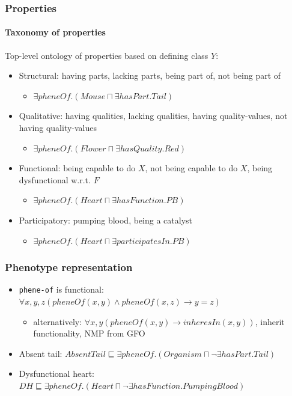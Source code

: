 \documentclass{beamer}
\begin{document}
\begin{frame}
\frametitle{Properties}
\framesubtitle{Taxonomy of properties}
Top-level ontology of properties based on defining class $Y$:
\begin{itemize}
\item Structural: having parts, lacking parts, being part of, not
  being part of
  \begin{itemize}
  \item $\exists pheneOf.(Mouse \sqcap \exists hasPart.Tail)$
  \end{itemize}
\item Qualitative: having qualities, lacking qualities, having
  quality-values, not having quality-values
  \begin{itemize}
  \item $\exists pheneOf.(Flower \sqcap \exists hasQuality.Red)$
  \end{itemize}
\item Functional: being capable to do $X$, not being capable to do
  $X$, being dysfunctional w.r.t. $F$
  \begin{itemize}
  \item $\exists pheneOf.(Heart \sqcap \exists hasFunction.PB)$
  \end{itemize}
\item Participatory: pumping blood, being a catalyst
  \begin{itemize}
  \item $\exists pheneOf.(Heart \sqcap \exists participatesIn.PB)$
  \end{itemize}
\end{itemize}
\end{frame}

\begin{frame}
\frametitle{Phenotype representation}
\begin{itemize}
\item {\tt phene-of} is functional:
  $\forall x,y,z (pheneOf(x,y) \land pheneOf(x,z) \rightarrow y=z)$
  \begin{itemize}
  \item alternatively: $\forall x,y(pheneOf(x,y) \rightarrow
    inheresIn(x,y))$, inherit functionality, NMP from GFO
  \end{itemize}
\item Absent tail:
  $AbsentTail \sqsubseteq \exists pheneOf.(Organism \sqcap \neg
  \exists hasPart.Tail)$
\item Dysfunctional heart: $DH \sqsubseteq \exists pheneOf.(Heart
  \sqcap \neg \exists hasFunction.PumpingBlood)$
\end{itemize}
\end{frame}
\end{document}

